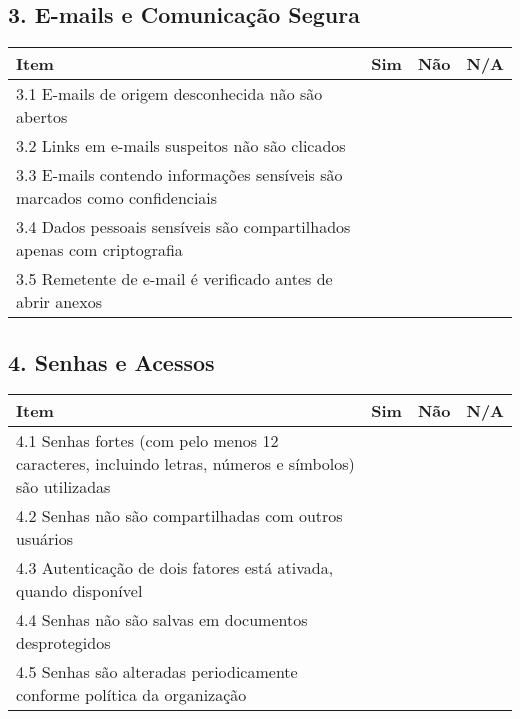 \documentclass[12pt,a4paper]{report}
\begin{document}
\begin{tcolorbox}[colback=boxcolor,colframe=sectioncolor,arc=2mm,title=\textbf{CHECKLIST MENSAL DE SEGURANÇA DA INFORMAÇÃO}]
\subsection*{3. E-mails e Comunicação Segura}
\begin{tabular}{|p{8cm}|p{1cm}|p{1cm}|p{1cm}|}
\hline
\textbf{Item} & \textbf{Sim} & \textbf{Não} & \textbf{N/A} \\
\hline
3.1 E-mails de origem desconhecida não são abertos & & & \\
\hline
3.2 Links em e-mails suspeitos não são clicados & & & \\
\hline
3.3 E-mails contendo informações sensíveis são marcados como confidenciais & & & \\
\hline
3.4 Dados pessoais sensíveis são compartilhados apenas com criptografia & & & \\
\hline
3.5 Remetente de e-mail é verificado antes de abrir anexos & & & \\
\hline
\end{tabular}

\subsection*{4. Senhas e Acessos}
\begin{tabular}{|p{8cm}|p{1cm}|p{1cm}|p{1cm}|}
\hline
\textbf{Item} & \textbf{Sim} & \textbf{Não} & \textbf{N/A} \\
\hline
4.1 Senhas fortes (com pelo menos 12 caracteres, incluindo letras, números e símbolos) são utilizadas & & & \\
\hline
4.2 Senhas não são compartilhadas com outros usuários & & & \\
\hline
4.3 Autenticação de dois fatores está ativada, quando disponível & & & \\
\hline
4.4 Senhas não são salvas em documentos desprotegidos & & & \\
\hline
4.5 Senhas são alteradas periodicamente conforme política da organização & & & \\
\hline
\end{tabular}


\end{tcolorbox}
\end{document}
